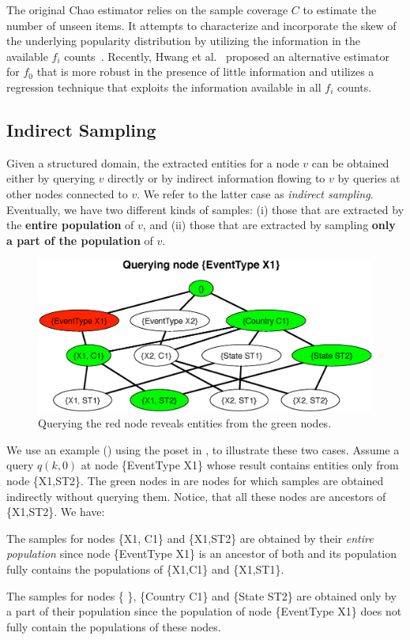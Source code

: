The original Chao estimator relies on the sample coverage $C$ to estimate the number of unseen items. It attempts to characterize and incorporate the skew of the underlying popularity distribution by utilizing the information in the available $f_i$ counts~\cite{chao:1992}. Recently, Hwang et al.~\cite{hwang:2010} proposed an alternative estimator for $f_0$ that is more robust in the presence of little information and utilizes a regression technique that exploits the information available in all $f_i$ counts.  

\subsection{Indirect Sampling}
\label{sec:indirectsampling}
Given a structured domain, the extracted entities for a node $v$ can be obtained either by querying $v$ directly or by indirect information flowing to $v$ by queries at other nodes connected to $v$. We refer to the latter case as {\em indirect sampling}. Eventually, we have two different kinds of samples: (i) those that are extracted by the {\bf entire population} of $v$, and (ii) those that are extracted by sampling {\bf only a part of the population} of $v$. 
\begin{figure}
	\begin{center}
	\includegraphics[clip,scale=0.32]{figs/exampleQuery.eps}	
	\caption{Querying the red node reveals entities from the green nodes.}
	\label{fig:query}
	\vspace{-20pt}
	\end{center}
\end{figure}
We use an example () using the poset in , to illustrate these two cases. Assume a query $q(k,0)$ at node \{EventType X1\} whose result contains entities only from node \{X1,ST2\}. The green nodes in  are nodes for which samples are obtained indirectly without querying them. Notice, that all these nodes are ancestors of \{X1,ST2\}. We have:
\squishlist
\item The samples for nodes \{X1, C1\} and \{X1,ST2\} are obtained by their {\em entire population} since node \{EventType X1\} is an ancestor of both and its population fully contains the populations of \{X1,C1\} and \{X1,ST1\}. 
\item The samples for nodes \{ \}, \{Country C1\} and \{State ST2\} are obtained only by a part of their population since the population of node \{EventType X1\} does not fully contain the populations of these nodes. 
\squishend

